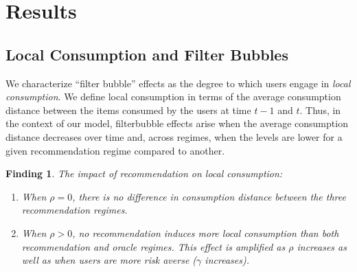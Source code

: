 \documentclass[manuscript]{acmart}
\newtheorem{finding}{Finding}
\begin{document}
\section{Results}
\subsection{Local Consumption and Filter Bubbles}
We characterize ``filter bubble'' effects as the degree to which users engage in \textit{local consumption}. We define local consumption in terms of the average consumption distance between the items consumed by the users at time $t-1$ and $t$. Thus, in the context of our model, filter\dgedit{-}bubble effects arise when the average consumption distance decreases over time and, across regimes, when the levels are lower for a given recommendation regime compared to another.




\begin{finding}\label{finding_local_consumption}
The impact of recommendation on local consumption:
\begin{enumerate}
\item When $\rho = 0$, there is no difference in consumption distance between the three recommendation regimes.
\item When $\rho > 0$, no recommendation induces more local consumption than both recommendation and oracle regimes. This effect is amplified as $\rho$ increases as well as when users are more risk averse ($\gamma$ increases).
\end{enumerate}
\end{finding}
\end{document}
